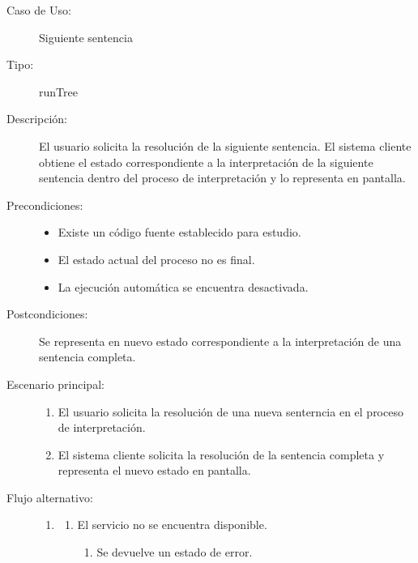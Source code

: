 \begin{description}
   \item[Caso de Uso:] Siguiente sentencia
   \item [Tipo:] runTree
   \item[Descripción:] 
   El usuario solicita la resolución de la siguiente sentencia. 
   El sistema cliente obtiene el estado correspondiente a la interpretación de la siguiente sentencia 
   dentro del proceso de interpretación y lo representa en pantalla.
  \item[Precondiciones:] \hfill 
   \begin{itemize}
   \item Existe un código fuente establecido para estudio. 
   \item El estado actual del proceso no es final.
   \item La ejecución automática se encuentra desactivada. 
   \end{itemize}
   \item[Postcondiciones:] 
   Se representa en nuevo estado correspondiente a la interpretación de una sentencia completa. 
   \item[Escenario principal:] \hfill
   \begin{enumerate}
   \item El usuario solicita la resolución de una nueva senterncia en el proceso de interpretación.
   \item El sistema cliente solicita la resolución de la sentencia completa y representa
   el nuevo estado en pantalla. 
   \end{enumerate}
   \item[Flujo alternativo:] \hfill 
   \begin{enumerate} \itemsep1pt \parskip0pt 
   \setcounter{enumi}{1}
   \renewcommand{\labelenumi}{}
   \renewcommand{\labelenumiii}{\arabic{enumiii}.}
   \renewcommand{\labelenumii}{\arabic{enumi}\alph{enumii}.}
      \item 
      \begin {enumerate}
         \setcounter{enumii}{0}
         \item El servicio no se encuentra disponible.
         \begin{enumerate}
         \item Se devuelve un estado de error.
         \end{enumerate}
      \end{enumerate}
   \end{enumerate}
\end{description}


